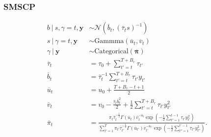 \subsubsection{SMSCP}
\small
\begin{align*}
    b \:|\: s, \gamma = t, \mathbf{y} &\sim \mathcal{N}(\overline{b}_t, (\overline{\tau}_t s)^{-1}) \\
    s \:|\: \gamma = t, \mathbf{y} &\sim \text{Gammma}(\overline{u}_t, \overline{v}_t) \\
    \gamma \:|\: \mathbf{y} &\sim \text{Categorical}(\overline{\boldsymbol{\pi}}) \\
    \overline{\tau}_t &= \tau_0 + \sum_{t' = t}^{T+B_r} \tau_{t'}  \\
    \overline{b}_t &= \overline{\tau}^{-1}_t \sum_{t'=t}^{T+B_r} \tau_{t'} y_{t'} \\
    \overline{u}_t &= u_0 + \frac{T +B_r- t + 1}{2} \\
    \overline{v}_t &= v_0 - \frac{\overline{\tau}_t\overline{b}^2_t}{2} + \frac{1}{2} \sum_{t'=t}^{T+B_r} \tau_{t'}y_{t'}^2 \\
    \overline{\pi}_t &= \frac{\pi_t\overline{\tau}_t^{-\frac{1}{2}} \Gamma(\overline{u}_t) \overline{v}_t^{-\overline{u}_t}\exp\left(- \frac{1}{2}\sum_{t'=1}^{t-1} \tau_{t'}y^2_{t'}\right)}{\sum_{t'=1}^T\pi_{t'}\overline{\tau}_{t'}^{-\frac{1}{2}} \Gamma(\overline{u}_{t'}) \overline{v}_{t'}^{-\overline{u}_{t'}}\exp\left(- \frac{1}{2}\sum_{t''=1}^{t'-1} \tau_{t''}y^2_{t''}\right)}.
\end{align*}
\normalsize
